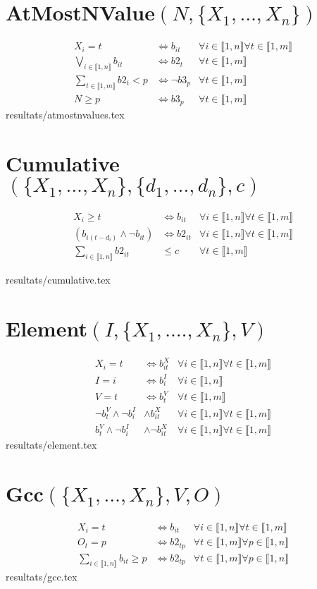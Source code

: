 \documentclass{article}
\newcommand{\cumul}{Cumulative$(\{X_1,\ldots,X_n\},\{d_1,\ldots,d_n\},c)~$}
\newcommand{\atmnvalue}{AtMostNValue$(N,\{X_1,\ldots,X_n\})~$}
\newcommand{\gcc}{Gcc$(\{X_1,\ldots,X_n\},V,O)~$}
\newcommand{\element}{Element$(I,\{X_1,.\ldots,X_n\},V)~$}
\newcommand{\I}{i\in\llbracket1,n\rrbracket}
\newcommand{\T}{t\in\llbracket1,m\rrbracket}
\newcommand{\PP}{p\in\llbracket1,n\rrbracket}
\newcommand{\fai}{\forall\I}
\newcommand{\fat}{\forall\T}
\newcommand{\fap}{\forall\PP}
\newcommand{\fit}{\fai\fat}
\begin{document}
\section{\texorpdfstring{\atmnvalue}{atmnvalue}}
\begin{align*}
    X_i=t &\iff b_{it}&\fit\\
    \bigvee_{\I}b_{it}&\iff b2_t&\fat\\
    \sum_{\T}b2_{t} < p&\iff \neg b3_{p}&\fat\\
    N\geq p &\iff b3_p&\fat
\end{align*}
{resultats/atmostnvalues.tex}

\section{\texorpdfstring{\cumul}{cumul}}
\begin{align*}
    X_i \geq t & \iff b_{it}&\fit\\
    (b_{i(t-d_i)} \wedge \neg b_{it}) & \iff b2_{it}&\fit\\
    \sum_{\I} b2_{it} & \leq c & \fat
\end{align*}
\begin{tiny}
{resultats/cumulative.tex}
\end{tiny}

\section{\texorpdfstring{\element}{element}}
\begin{align*}
    X_i=t &\iff b_{it}^X&\fit\\
    I=i &\iff b_i^I&\fai\\
    V=t &\iff b_t^V&\fat\\
    \neg b_t^V\wedge \neg b_i^I & \wedge b_{it}^X &\fit\\
    b_t^V\wedge \neg b_i^I & \wedge \neg b_{it}^X &\fit
\end{align*}
{resultats/element.tex}

\section{\texorpdfstring{\gcc}{gcc}}
\begin{align*}
    X_i=t &\iff b_{it}&\fit\\
    O_t=p &\iff b2_{tp}&\fat\fap\\
    \sum_{\I}b_{it} \geq p&\iff b2_{tp}&\fat\fap
\end{align*}
{resultats/gcc.tex}
\end{document}
